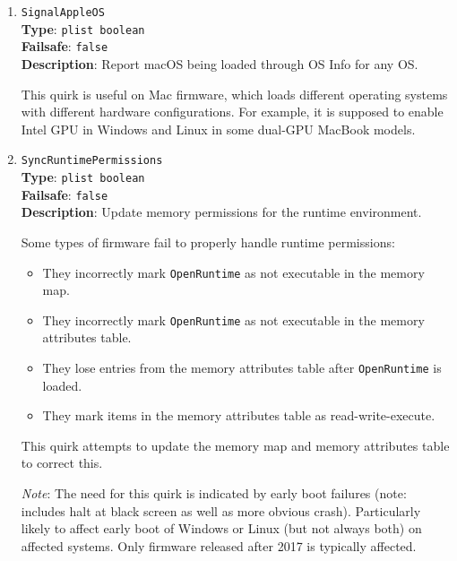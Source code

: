 \documentclass[]{article}
\providecommand{\tightlist}{%
  \setlength{\itemsep}{0pt}\setlength{\parskip}{0pt}}
\begin{document}
\begin{enumerate}
  \emph{Note 1}: The need for this quirk is determined by early boot failures.

  \emph{Note 2}: This quirk is not compatible with 32-bit kernels.

\item
  \texttt{SignalAppleOS}\\
  \textbf{Type}: \texttt{plist\ boolean}\\
  \textbf{Failsafe}: \texttt{false}\\
  \textbf{Description}: Report macOS being loaded through OS Info for any OS.

  This quirk is useful on Mac firmware, which loads different operating systems
  with different hardware configurations. For example, it is supposed to enable
  Intel GPU in Windows and Linux in some dual-GPU MacBook models.

\item
  \texttt{SyncRuntimePermissions}\\
  \textbf{Type}: \texttt{plist\ boolean}\\
  \textbf{Failsafe}: \texttt{false}\\
  \textbf{Description}: Update memory permissions for the runtime environment.

  Some types of firmware fail to properly handle runtime permissions:
  \begin{itemize}
    \tightlist
    \item They incorrectly mark \texttt{OpenRuntime} as not executable in the memory map.
    \item They incorrectly mark \texttt{OpenRuntime} as not executable in the memory
    attributes table.
    \item They lose entries from the memory attributes table after \texttt{OpenRuntime}
    is loaded.
    \item They mark items in the memory attributes table as read-write-execute.
  \end{itemize}

  This quirk attempts to update the memory map and memory attributes table to correct this.

  \emph{Note}: The need for this quirk is indicated by early boot failures (note: includes halt at black
  screen as well as more obvious crash). Particularly likely to affect early boot of Windows or Linux (but
  not always both) on affected systems. Only firmware released after 2017 is typically affected.

\end{enumerate}
\end{document}
